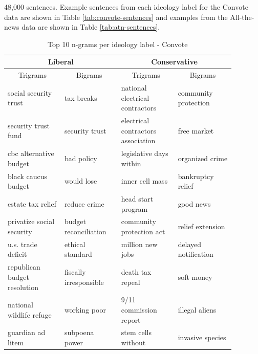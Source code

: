 \documentclass[10pt,a4paper,onecolumn]{article}
\begin{document}
48,000 sentences. Example sentences from each ideology label for the Convote data are shown in Table \ref{tab:convote-sentences} and examples from the All-the-news data are shown in Table \ref{tab:atn-sentences}.

\begin{table}[h!]
	\begin{center}
		\caption{Top 10 n-grams per ideology label - Convote}
		\label{tab:ngrams-convote}
		\begin{tabular}{p{0.22\linewidth}|p{0.22\linewidth}|p{0.22\linewidth}|p{0.22\linewidth}}
			\hline\hline
			\multicolumn{2}{c|}{\textbf{Liberal}} & \multicolumn{2}{c|}{\textbf{Conservative}} \\
			\hline
			\multicolumn{1}{c|}{Trigrams} & \multicolumn{1}{c|}{Bigrams} & \multicolumn{1}{c|}{Trigrams} & \multicolumn{1}{c|}{Bigrams} \\
			\hline
			social security trust & tax breaks & national electrical contractors & community protection \\
			security trust fund & security trust & electrical contractors association & free market \\
			cbc alternative budget & bad policy & legislative days within & organized crime \\
			black caucus budget & would lose & inner cell mass & bankruptcy relief \\
			estate tax relief & reduce crime & head start program & good news \\
			privatize social security & budget reconciliation & community protection act & relief extension \\
			u.s. trade deficit & ethical standard & million new jobs & delayed notification \\
			republican budget resolution & fiscally irresponsible & death tax repeal & soft money \\
			national wildlife refuge & working poor & 9/11 commission report & illegal aliens \\
			guardian ad litem & subpoena power & stem cells without & invasive species \\
			\hline\hline
		\end{tabular}
	\end{center}
\end{table}
\end{document}
